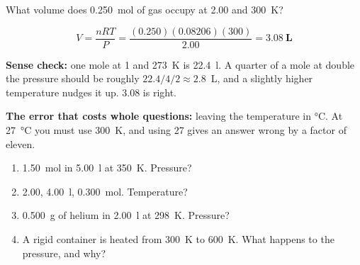 \documentclass{apchem-worksheet}
\begin{document}
\begin{workedexample}
What volume does \SI{0.250}{\mole} of gas occupy at \SI{2.00}{\atm} and
\SI{300}{\kelvin}?

\[ V = \frac{nRT}{P} = \frac{(0.250)(0.08206)(300)}{2.00}
   = \mathbf{3.08~L} \]

\textbf{Sense check:} one mole at \SI{1}{\atm} and \SI{273}{\kelvin} is
\SI{22.4}{\litre}. A quarter of a mole at double the pressure should be
roughly $22.4/4/2 \approx 2.8$~L, and a slightly higher temperature nudges
it up. \num{3.08} is right.

\textbf{The error that costs whole questions:} leaving the temperature in
\si{\celsius}. At \SI{27}{\celsius} you must use \SI{300}{\kelvin}, and
using 27 gives an answer wrong by a factor of eleven.
\end{workedexample}

\begin{yourturn}
\begin{enumerate}[leftmargin=*,itemsep=0.5em]
  \item \SI{1.50}{\mole} in \SI{5.00}{\litre} at \SI{350}{\kelvin}.
        Pressure? \workspace[1.6cm]
  \item \SI{2.00}{\atm}, \SI{4.00}{\litre}, \SI{0.300}{\mole}.
        Temperature? \workspace[1.6cm]
  \item \SI{0.500}{\gram} of helium in \SI{2.00}{\litre} at
        \SI{298}{\kelvin}. Pressure? \workspace[1.8cm]
  \item A rigid container is heated from \SI{300}{\kelvin} to
        \SI{600}{\kelvin}. What happens to the pressure, and why?
        \workspace[1.8cm]
\end{enumerate}
\end{yourturn}

\end{document}
